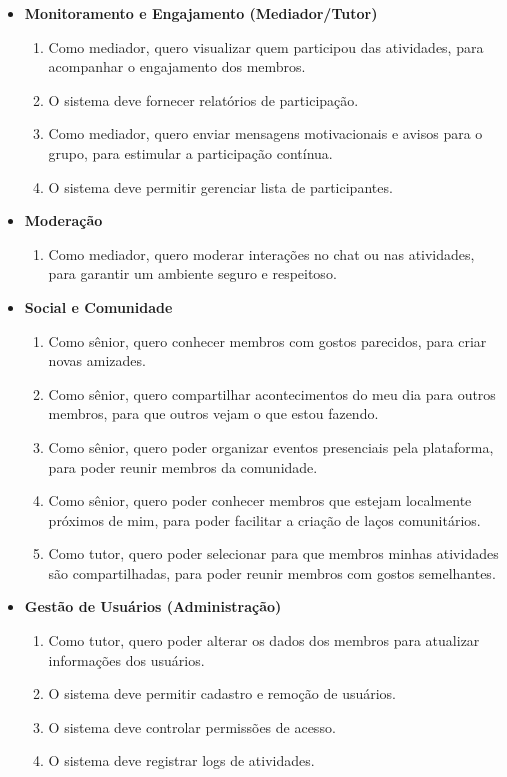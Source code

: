 \begin{itemize}
    \item \textbf{Monitoramento e Engajamento (Mediador/Tutor)}
        \begin{enumerate}
            \item [US12] Como mediador, quero visualizar quem participou das atividades, para acompanhar o engajamento dos membros.
            \item [RF10] O sistema deve fornecer relatórios de participação.
            \item [US13] Como mediador, quero enviar mensagens motivacionais e avisos para o grupo, para estimular a participação contínua.
            \item [RF11] O sistema deve permitir gerenciar lista de participantes.
        \end{enumerate}
 
    \item \textbf{Moderação}
        \begin{enumerate}
            \item [US14] Como mediador, quero moderar interações no chat ou nas atividades, para garantir um ambiente seguro e respeitoso.
        \end{enumerate}
 
    \item \textbf{Social e Comunidade}
        \begin{enumerate}
            \item [US15] Como sênior, quero conhecer membros com gostos parecidos, para criar novas amizades.
            \item [US16] Como sênior, quero compartilhar acontecimentos do meu dia para outros membros, para que outros vejam o que estou fazendo.
            \item [US17] Como sênior, quero poder organizar eventos presenciais pela plataforma, para poder reunir membros da comunidade.
            \item [US18] Como sênior, quero poder conhecer membros que estejam localmente próximos de mim, para poder facilitar a criação de laços comunitários.
            \item [US19] Como tutor, quero poder selecionar para que membros minhas atividades são compartilhadas, para poder reunir membros com gostos semelhantes.
        \end{enumerate}
 
    \item \textbf{Gestão de Usuários (Administração)}
        \begin{enumerate}
            \item [US20] Como tutor, quero poder alterar os dados dos membros para atualizar informações dos usuários.
            \item [RF12] O sistema deve permitir cadastro e remoção de usuários.
            \item [RF13] O sistema deve controlar permissões de acesso.
            \item [RF14] O sistema deve registrar logs de atividades.
        \end{enumerate}
 

\end{itemize}
